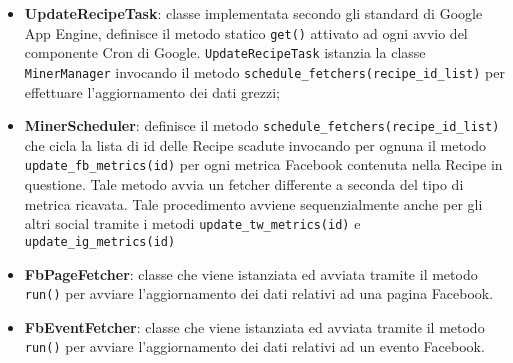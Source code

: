     \begin{itemize}
        \item \textbf{UpdateRecipeTask}: classe implementata secondo gli standard di Google App Engine, definisce il metodo statico \texttt{get()} attivato ad ogni avvio del componente Cron di Google. \texttt{UpdateRecipeTask} istanzia la classe \texttt{MinerManager} invocando il metodo \texttt{schedule\_fetchers(recipe\_id\_list)} per effettuare l'aggiornamento dei dati grezzi;
        \item \textbf{MinerScheduler}: definisce il metodo \texttt{schedule\_fetchers(recipe\_id\_list)} che cicla la lista di id delle Recipe scadute invocando per ognuna il metodo \texttt{update\_fb\_metrics(id)} per ogni metrica Facebook contenuta nella Recipe in questione. Tale metodo avvia un fetcher differente a seconda del tipo di metrica ricavata. Tale procedimento avviene sequenzialmente anche per gli altri social tramite i metodi \texttt{update\_tw\_metrics(id)} e \texttt{update\_ig\_metrics(id)}
        \item \textbf{FbPageFetcher}: classe che viene istanziata ed avviata tramite il metodo \texttt{run()} per avviare l'aggiornamento dei dati relativi ad una pagina Facebook.
        \item \textbf{FbEventFetcher}: classe che viene istanziata ed avviata tramite il metodo \texttt{run()} per avviare l'aggiornamento dei dati relativi ad un evento Facebook.
    \end{itemize}




